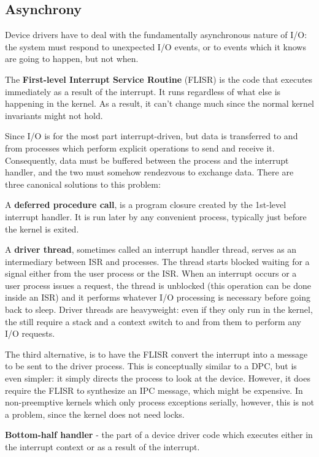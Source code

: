 \subsection{Asynchrony}

Device drivers have to deal with the fundamentally asynchronous nature of I/O: the system must respond to unexpected I/O events, or to events which it knows are going to happen, but not when. \medskip

The \textbf{First-level Interrupt Service Routine} (FLISR) is the code that executes immediately as a result of the interrupt. It runs regardless of what else is happening in the kernel. As a result, it can't change much since the normal kernel invariants might not hold. \medskip

Since I/O is for the most part interrupt-driven, but data is transferred to and from processes which perform explicit operations to send and receive it. Consequently, data must be buffered between the process and the interrupt handler, and the two must somehow rendezvous to exchange data. There are three canonical solutions to this problem:

A \textbf{deferred procedure call}, is a program closure created by the 1st-level interrupt handler. It is run later by any convenient process, typically just before the kernel is exited. \medskip

A \textbf{driver thread}, sometimes called an interrupt handler thread, serves as an intermediary between ISR and processes. The thread starts blocked waiting for a signal either from the user process or the ISR. When an interrupt occurs or a user process issues a request, the thread is unblocked (this operation can be done inside an ISR) and it performs whatever I/O processing is necessary before going back to sleep. Driver threads are heavyweight: even if they only run in the kernel, the still require a stack and a context switch to and from them to perform any I/O requests. \medskip

The third alternative, is to have the FLISR convert the interrupt into a message to be sent to the driver process. This is conceptually similar to a DPC, but is even simpler: it simply directs the process to look at the device. However, it does require the FLISR to synthesize an IPC message, which might be expensive. In non-preemptive kernels which only process exceptions serially, however, this is not a problem, since the kernel does not need locks. \medskip

\textbf{Bottom-half handler} - the part of a device driver code which executes either in the interrupt context or as a result of the interrupt. \medskip

